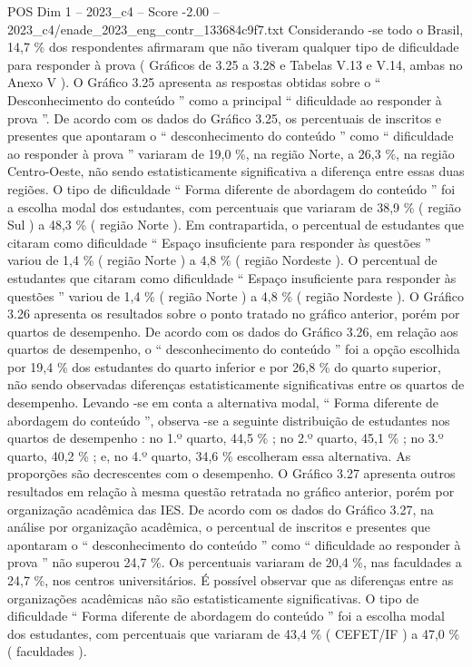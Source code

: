 \begin{textsample}{POS Dim 1 – 2023\_c4 – Score -2.00 – 2023\_c4/enade\_2023\_eng\_contr\_133684c9f7.txt}
Considerando -se todo o Brasil, 14,7 \% dos respondentes afirmaram que não tiveram qualquer tipo de dificuldade para responder à prova ( Gráficos de 3.25 a 3.28 e Tabelas V.13 e V.14, ambas no Anexo V ).
O Gráfico 3.25 apresenta as respostas obtidas sobre o “ Desconhecimento do conteúdo ” como a principal “ dificuldade ao responder à prova ”.
De acordo com os dados do Gráfico 3.25, os percentuais de inscritos e presentes que apontaram o “ desconhecimento do conteúdo ” como “ dificuldade ao responder à prova ” variaram de 19,0 \%, na região Norte, a 26,3 \%, na região Centro-Oeste, não sendo estatisticamente significativa a diferença entre essas duas regiões.
O tipo de dificuldade “ Forma diferente de abordagem do conteúdo ” foi a escolha modal dos estudantes, com percentuais que variaram de 38,9 \% ( região Sul ) a 48,3 \% ( região Norte ).
Em contrapartida, o percentual de estudantes que citaram como dificuldade “ Espaço insuficiente para responder às questões ” variou de 1,4 \% ( região Norte ) a 4,8 \% ( região Nordeste ).
O percentual de estudantes que citaram como dificuldade “ Espaço insuficiente para responder às questões ” variou de 1,4 \% ( região Norte ) a 4,8 \% ( região Nordeste ).
O Gráfico 3.26 apresenta os resultados sobre o ponto tratado no gráfico anterior, porém por quartos de desempenho.
De acordo com os dados do Gráfico 3.26, em relação aos quartos de desempenho, o “ desconhecimento do conteúdo ” foi a opção escolhida por 19,4 \% dos estudantes do quarto inferior e por 26,8 \% do quarto superior, não sendo observadas diferenças estatisticamente significativas entre os quartos de desempenho.
Levando -se em conta a alternativa modal, “ Forma diferente de abordagem do conteúdo ”, observa -se a seguinte distribuição de estudantes nos quartos de desempenho : no 1.º quarto, 44,5 \% ; no 2.º quarto, 45,1 \% ; no 3.º quarto, 40,2 \% ; e, no 4.º quarto, 34,6 \% escolheram essa alternativa.
As proporções são decrescentes com o desempenho.
O Gráfico 3.27 apresenta outros resultados em relação à mesma questão retratada no gráfico anterior, porém por organização acadêmica das IES.
De acordo com os dados do Gráfico 3.27, na análise por organização acadêmica, o percentual de inscritos e presentes que apontaram o “ desconhecimento do conteúdo ” como “ dificuldade ao responder à prova ” não superou 24,7 \%.
Os percentuais variaram de 20,4 \%, nas faculdades a 24,7 \%, nos centros universitários.
É possível observar que as diferenças entre as organizações acadêmicas não são estatisticamente significativas.
O tipo de dificuldade “ Forma diferente de abordagem do conteúdo ” foi a escolha modal dos estudantes, com percentuais que variaram de 43,4 \% ( CEFET/IF ) a 47,0 \% ( faculdades ).

\end{textsample}
